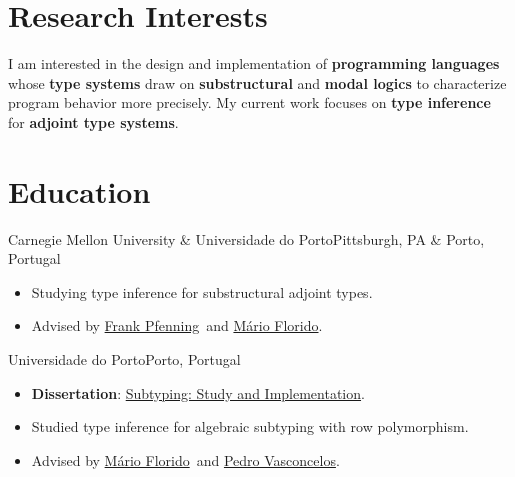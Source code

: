 \documentclass[12pt,a4paper]{moderncv}
\begin{document}
\makecvtitle%

\vspace*{-2em}%

\newcommand{\florido}{\href{https://liacc.fe.up.pt/member/amf}{Mário Florido}}
\newcommand{\vasconcelos}{\href{https://www.dcc.fc.up.pt/~pbv/}{Pedro Vasconcelos}}
\newcommand{\pfenning}{\href{https://www.cs.cmu.edu/~fp/}{Frank Pfenning}}


\section{Research Interests}


I am interested in the design and implementation of \textbf{programming languages} whose \textbf{type systems} draw on \textbf{substructural} and \textbf{modal logics} to characterize program behavior more precisely. My current work focuses on \textbf{type inference} for \textbf{adjoint type systems}.


\section{Education}

    {Carnegie Mellon University \& Universidade do Porto}{Pittsburgh, PA \& Porto, Portugal}{}{
    \begin{itemize}[noitemsep]
        \item[--] Studying type inference for substructural adjoint types.
        \item[--] Advised by \pfenning\ and \florido.
    \end{itemize}}

    {Universidade do Porto}{Porto, Portugal}{}{
        \begin{itemize}[noitemsep]
            \item[--] \textbf{Dissertation}: \href{https://hdl.handle.net/10216/156497}{Subtyping: Study and Implementation}.
            \item[--] Studied type inference for algebraic subtyping with row polymorphism.
            \item[--] Advised by \florido\ and \vasconcelos.
        \end{itemize}}
\end{document}

